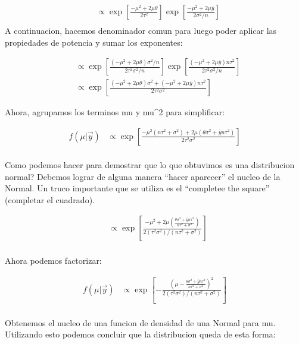 \documentclass[
  letterpaper,
  DIV=11,
  numbers=noendperiod]{scrartcl}
\begin{document}
\[
\begin{aligned}
&\propto \exp\left[\frac{-\mu^2 + 2\mu\theta}{2\tau^2}\right] \exp\left[\frac{-\mu^2 + 2\mu\bar{y}}{2\sigma^2/n}\right] \\[2ex]
\end{aligned}
\] A continuacion, hacemos denominador comun para luego poder aplicar
las propiedades de potencia y sumar los exponentes:

\[
\begin{aligned}
&\propto \exp\left[\frac{(-\mu^2 + 2\mu\theta)\sigma^2/n}{2\tau^2\sigma^2/n}\right] \exp\left[\frac{(-\mu^2 + 2\mu\bar{y})n\tau^2}{2\tau^2\sigma^2/n}\right] \\
&\propto \exp\left[\frac{(-\mu^2 + 2\mu\theta)\sigma^2 + (-\mu^2 + 2\mu\bar{y})n\tau^2}{2\tau^2\sigma^2}\right]
\end{aligned}
\]

Ahora, agrupamos los terminos mu y mu\^{}2 para simplificar:

\[
\begin{aligned}
f(\mu|\vec{y}) &\propto \exp\left[\frac{-\mu^2(n\tau^2 + \sigma^2) + 2\mu(\theta\sigma^2 + \bar{y}n\tau^2)}{2\tau^2\sigma^2}\right] \\
\end{aligned}
\]

Como podemos hacer para demostrar que lo que obtuvimos es una
distribucion normal? Debemos lograr de alguna manera ``hacer aparecer''
el nucleo de la Normal. Un truco importante que se utiliza es el
``completee the square'' (completar el cuadrado).

\[
\begin{aligned}
&\propto \exp\left[\frac{-\mu^2 + 2\mu\left(\frac{\theta\sigma^2 + \bar{y}n\tau^2}{n\tau^2 + \sigma^2}\right)}{2(\tau^2\sigma^2)/(n\tau^2 + \sigma^2)}\right] \\[3ex]
\end{aligned}
\]

Ahora podemos factorizar:

\[
\begin{aligned}
f(\mu|\vec{y}) &\propto \exp\left[-\frac{\left(\mu - \frac{\theta\sigma^2 + \bar{y}n\tau^2}{n\tau^2 + \sigma^2}\right)^2}{2(\tau^2\sigma^2)/(n\tau^2 + \sigma^2)}\right] \\[3ex]
\end{aligned}
\]

Obtenemos el nucleo de una funcion de densidad de una Normal para mu.
Utilizando esto podemos concluir que la distribucion queda de esta
forma:
\end{document}
